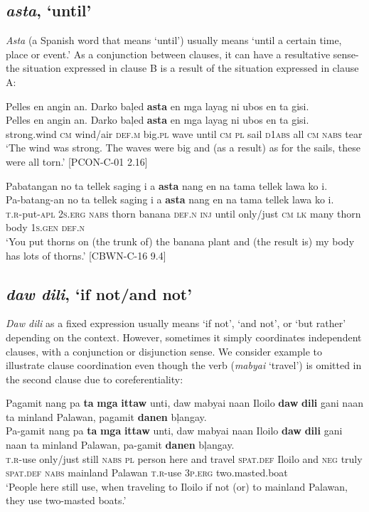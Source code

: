 \subsection{\textit{asta}, ‘until’}
\label{sec:asta}
\textit{Asta} (a Spanish word that means ‘until’) usually means ‘until a certain time, place or event.’  As a conjunction between clauses, it can have a resultative sense-the situation expressed in clause B is a result of the situation expressed in clause A:

\ea
Pelles en angin an. Darko baļed \textbf{asta} en mga layag ni ubos en ta gisi.\\\smallskip
\gll Pelles en angin an. Darko baļed \textbf{asta} en mga layag ni ubos en ta gisi. \\
strong.wind \textsc{cm} wind/air \textsc{def.m} big.\textsc{pl} wave until \textsc{cm} \textsc{pl} sail \textsc{d1abs} all \textsc{cm} \textsc{nabs} tear \\
\glt ‘The wind was strong. The waves were big and (as a result) as for the sails, these were all torn.’ [PCON-C-01 2.16]
\z

\ea
Pabatangan no ta tellek saging i a \textbf{asta} nang en na tama tellek lawa ko i.\\\smallskip
\gll Pa-batang-an no ta tellek saging i a \textbf{asta} nang en na tama tellek lawa ko i. \\
\textsc{t.r}-put-\textsc{apl} 2\textsc{s.erg} \textsc{nabs} thorn banana \textsc{def.n} \textsc{inj} until only/just \textsc{cm} \textsc{lk} many thorn body 1\textsc{s.gen} \textsc{def.n} \\
\glt ‘You put thorns on (the trunk of) the banana plant and (the result is) my body has lots of thorns.’ [CBWN-C-16 9.4]
\z

\subsection{\textit{daw dili}, `if not/and not'}
\label{sec:dawdili}
\textit{Daw dili} as a fixed expression usually means ‘if not’, ‘and not’, or ‘but rather’ depending on the context. However, sometimes it simply coordinates independent clauses, with a conjunction or disjunction sense. We consider example  to illustrate clause coordination even though the verb (\textit{mabyai} ‘travel’) is omitted in the second clause due to coreferentiality:

\ea
\label{ex:usetwomastedboats}
Pagamit nang pa \textbf{ta} \textbf{mga} \textbf{ittaw} unti, daw mabyai naan Iloilo \textbf{daw} \textbf{dili} gani naan ta minland Palawan, pagamit \textbf{danen} bļangay.\\\smallskip
\gll Pa-gamit nang pa \textbf{ta} \textbf{mga} \textbf{ittaw} unti, daw mabyai naan Iloilo \textbf{daw} \textbf{dili} gani naan ta minland Palawan, pa-gamit \textbf{danen} bļangay. \\
\textsc{t.r}-use only/just still \textsc{nabs} \textsc{pl} person here and travel \textsc{spat.def} Iloilo and \textsc{neg} truly \textsc{spat.def} \textsc{nabs} mainland Palawan \textsc{t.r}-use 3\textsc{p.erg} two.masted.boat \\
\glt ‘People here still use, when traveling to Iloilo if not (or) to mainland Palawan, they use two-masted boats.’
\z

